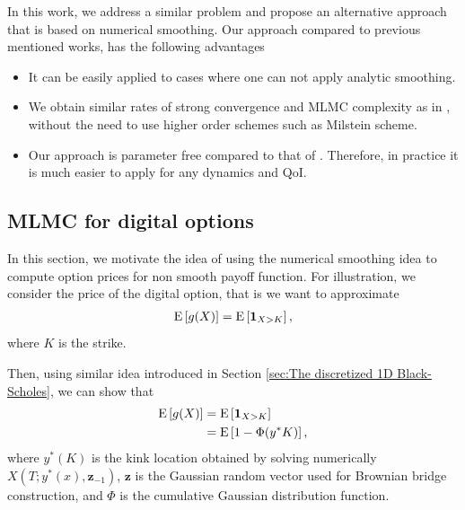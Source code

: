 In this work, we address a similar problem and  propose an alternative approach that is  based on numerical smoothing. Our approach compared to previous mentioned works, has the following advantages
\begin{itemize}
\item It can be easily applied to cases where one can not apply analytic smoothing.
\item We obtain similar  rates of strong convergence and MLMC complexity  as in  \cite{giles2008improved,giles2013numerical}, without the need to use higher order schemes such as Milstein scheme.
\item Our approach is parameter free compared to that of  \cite{giles2015multilevel}. Therefore, in practice it is much easier to apply for any dynamics and QoI.
\end{itemize} 

\subsection{MLMC for digital options}\label{sec: MLMC for digital options}
In this section, we motivate the idea of using the numerical smoothing idea to compute option prices for non smooth payoff function. For illustration, we consider  the price of the digital option, that is we want to approximate
\begin{align}
\mathrm{E}\left[g(X)\right]=\mathrm{E}\left[\mathbf{1}_{X>K}\right],
\end{align}
where $K$ is the strike. 

Then, using similar idea introduced in Section \ref{sec:The discretized 1D Black-Scholes}, we can show that
\begin{align}
\mathrm{E}\left[g(X)\right]&=\mathrm{E}\left[\mathbf{1}_{X>K}\right]\nonumber\\
&=\mathrm{E}\left[1-\Phi(y^\ast{K})\right],
\end{align}
where $y^\ast(K)$ is the kink location obtained by solving numerically $X(T; y^\ast(x), \mathbf{z}_{-1})$, $\mathbf{z}$ is the Gaussian random  vector used for Brownian bridge construction, and $\Phi$ is the cumulative Gaussian distribution function.

